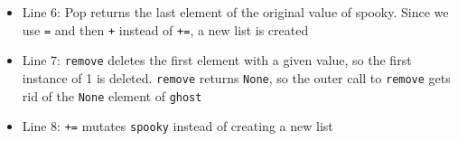 \begin{blocksection}
\begin{guide}
\begin{itemize}
    \item Line 6: Pop returns the last element of the original value of spooky. Since we use \lstinline{=} and then \lstinline{+} instead of \lstinline{+=}, a new list is created
    \item Line 7: \lstinline{remove} deletes the first element with a given value, so the first instance of 1 is deleted. \lstinline{remove} returns \lstinline{None}, so the outer call to \lstinline{remove} gets rid of the \lstinline{None} element of \lstinline{ghost}
    \item Line 8: \lstinline{+=} mutates \lstinline{spooky} instead of creating a new list 

  \end{itemize}
\end{guide}
\end{blocksection}